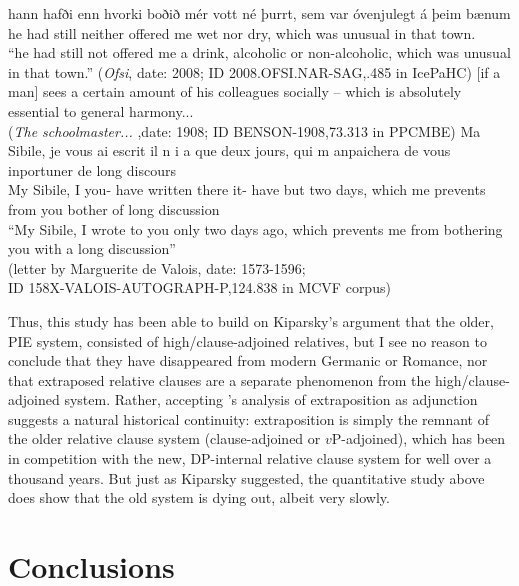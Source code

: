 \begin{exe}
         \ex \label{icecar2} \gll hann hafði enn hvorki boðið mér vott né þurrt, sem var óvenjulegt á þeim bænum\\
         he had still neither offered me wet nor dry, which was unusual in that town.\\
         \quad ``he had still not offered me a drink, alcoholic or non-alcoholic, which was unusual in that town.''
         (\textsl{Ofsi}, date: 2008; ID 2008.OFSI.NAR-SAG,.485 in IcePaHC)
         \ex \label{engcar2} [if a man] sees a certain amount of his colleagues socially --  which is absolutely essential to general harmony...\\
         (\textsl{The schoolmaster...} ,date: 1908; ID BENSON-1908,73.313 in PPCMBE)
         \ex \label{frecar} \gll Ma Sibile, je vous ai escrit il n i a que deux jours, qui m anpaichera de vous inportuner de long discours \\
         My Sibile, I you- have written there  it- have but two days, which me prevents from you bother of long discussion\\
         \quad ``My Sibile, I wrote to you only two days ago, which prevents me from bothering you with a long discussion''\\
         (letter by Marguerite de Valois, date: 1573-1596; \\ID 158X-VALOIS-AUTOGRAPH-P,124.838 in MCVF corpus)

\end{exe}


Thus, this study has been able to build on Kiparsky's argument that the older, PIE system, consisted of high/clause-adjoined relatives, but I see no reason to conclude that they have disappeared from modern Germanic or Romance, nor that extraposed relative clauses are a separate phenomenon from the high/clause-adjoined system. Rather, accepting \citet{culicoverrochemont1990}'s analysis of extraposition as adjunction suggests a natural historical continuity: extraposition is simply the remnant of the older relative clause system (clause-adjoined or $v$P-adjoined), which has been in competition with the new, DP-internal relative clause system for well over a thousand years. But just as Kiparsky suggested, the quantitative study above does show that the old system is dying out, albeit very slowly.


\section{Conclusions}


